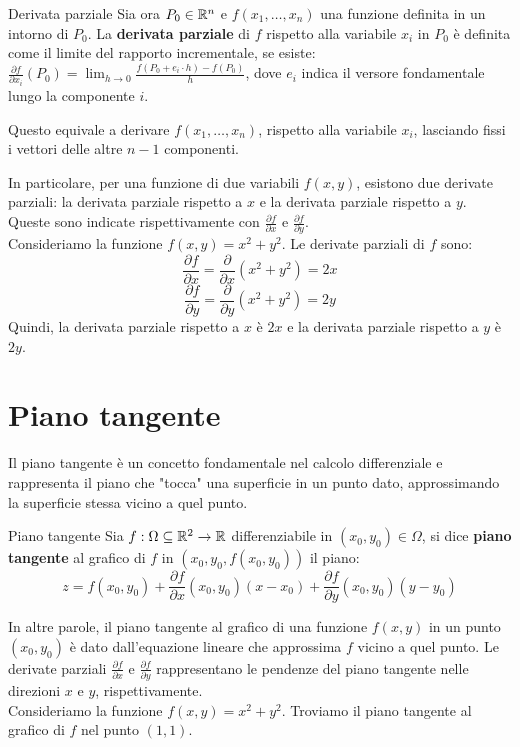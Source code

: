 \begin{definizione}{Derivata parziale}
  Sia ora $P_0 \in \mathbb{R}^n $ e $f(x_1, \dots, x_n)$ una funzione definita in un intorno di $P_0$. La \textbf{derivata parziale} di $f$ rispetto alla variabile $x_i$ in $P_0$ è definita come il limite del rapporto incrementale, se esiste: $
\frac{\partial f}{\partial x_i}(P_0) = \lim_{h \to 0} \frac{f(P_0+e_i\cdot h) - f(P_0)}{h}$, dove $e_i$ indica il versore fondamentale lungo la componente $i$.
\end{definizione}
Questo equivale a derivare $f(x_1,\dots, x_n)$, rispetto alla variabile $x_i$, lasciando fissi i vettori delle altre $n-1$ componenti.

In particolare, per una funzione di due variabili $f(x,y)$, esistono due derivate parziali: la derivata parziale rispetto a $x$ e la derivata parziale rispetto a $y$. Queste sono indicate rispettivamente con $\frac{\partial f}{\partial x}$ e $\frac{\partial f}{\partial y}$. \\
Consideriamo la funzione $f(x,y) = x^2 + y^2$. Le derivate parziali di $f$ sono:
\[
\frac{\partial f}{\partial x} = \frac{\partial}{\partial x}(x^2 + y^2) = 2x
\]
\[
\frac{\partial f}{\partial y} = \frac{\partial}{\partial y}(x^2 + y^2) = 2y
\]
Quindi, la derivata parziale rispetto a $x$ è $2x$ e la derivata parziale rispetto a $y$ è $2y$.\\

\section{Piano tangente}
Il piano tangente è un concetto fondamentale nel calcolo differenziale e rappresenta il piano che "tocca" una superficie in un punto dato, approssimando la superficie stessa vicino a quel punto.

\begin{definizione}{Piano tangente}
Sia $f:\Omega \subseteq \mathbb{R}^2 \rightarrow \mathbb{R}$ differenziabile in $(x_0,y_0) \in \Omega$, si dice \textbf{piano tangente} al grafico di $f$ in $(x_0,y_0,f(x_0,y_0))$ il piano:
$$z=f(x_0,y_0)+\frac{\partial f}{\partial x}(x_0,y_0)(x-x_0)+\frac{\partial f}{\partial y}(x_0,y_0)(y-y_0)$$
\end{definizione}

In altre parole, il piano tangente al grafico di una funzione $f(x,y)$ in un punto $(x_0, y_0)$ è dato dall'equazione lineare che approssima $f$ vicino a quel punto. Le derivate parziali $\frac{\partial f}{\partial x}$ e $\frac{\partial f}{\partial y}$ rappresentano le pendenze del piano tangente nelle direzioni $x$ e $y$, rispettivamente.
\\
Consideriamo la funzione $f(x,y) = x^2 + y^2$. Troviamo il piano tangente al grafico di $f$ nel punto $(1,1)$.

